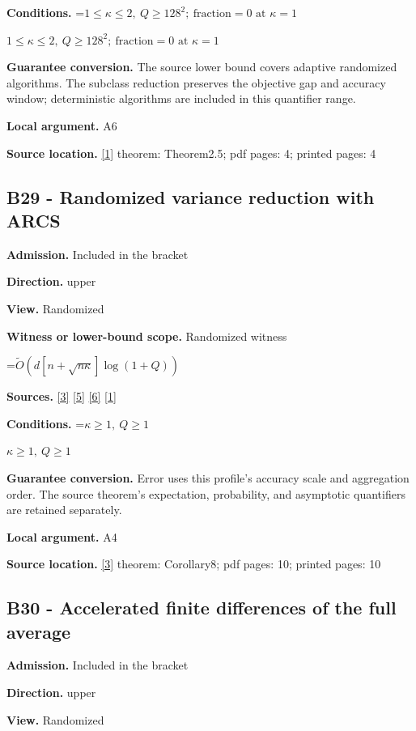 \documentclass[10pt,a4paper]{article}
\newcommand{\AtlasMath}[1]{\par\begingroup\centering\setbox0=\hbox{$\displaystyle #1$}\ifdim\wd0>1.4\linewidth\typeout{ATLAS WIDE FORMULA: \the\wd0}\fi\ifdim\wd0>\linewidth\resizebox{\linewidth}{!}{\box0}\else\box0\fi\par\endgroup}
\newcommand{\AtlasInlineMath}[1]{\begingroup\setbox0=\hbox{$#1$}\ifdim\wd0>.4\linewidth\endgroup\AtlasMath{#1}\else\endgroup$#1$\fi}
\begin{document}
\textbf{Conditions.} \AtlasInlineMath{1\le\kappa\le2,\ Q\ge128^2;\ \text{fraction}=0\text{ at }\kappa=1}

\textbf{Guarantee conversion.} The source lower bound covers adaptive randomized algorithms. The subclass reduction preserves the objective gap and accuracy window; deterministic algorithms are included in this quantifier range.

\textbf{Local argument.} A6

\textbf{Source location.} \href{https://arxiv.org/html/2610.00345v1}{[1]} theorem: Theorem2.5; pdf pages: 4; printed pages: 4

\subsection{B29 - Randomized variance reduction with ARCS}
\textbf{Admission.} Included in the bracket

\textbf{Direction.} upper

\textbf{View.} Randomized

\textbf{Witness or lower-bound scope.} Randomized witness

\AtlasMath{\widetilde{O}(d[n+\sqrt{n\kappa}]\log(1+Q))}
\textbf{Sources.} \href{https://arxiv.org/abs/2109.08858}{[3]} \href{https://arxiv.org/html/2607.16558v2}{[5]} \href{https://www.mathnet.ru/php/archive.phtml?jrnid=mzm&option_lang=eng&paperid=1697&wshow=paper}{[6]} \href{https://arxiv.org/html/2610.00345v1}{[1]}

\textbf{Conditions.} \AtlasInlineMath{\kappa\ge1,\ Q\ge1}

\textbf{Guarantee conversion.} Error uses this profile's accuracy scale and aggregation order. The source theorem's expectation, probability, and asymptotic quantifiers are retained separately.

\textbf{Local argument.} A4

\textbf{Source location.} \href{https://arxiv.org/abs/2109.08858}{[3]} theorem: Corollary8; pdf pages: 10; printed pages: 10

\subsection{B30 - Accelerated finite differences of the full average}
\textbf{Admission.} Included in the bracket

\textbf{Direction.} upper

\textbf{View.} Randomized
\end{document}
